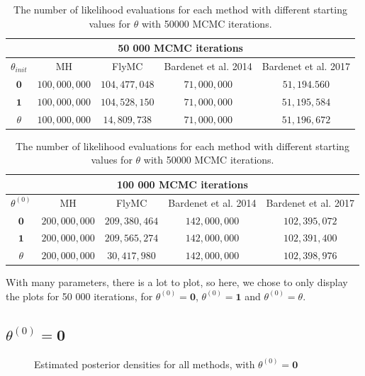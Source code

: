  \begin{table}
    \centering
\begin{tabular}{|c|c|c|c|c|}
  \hline
    \multicolumn{5}{|c|}{50 000 MCMC iterations} \\
    \hline
\hline
        $\theta_{init}$ &  MH & FlyMC & Bardenet et al. 2014 & Bardenet et al. 2017\\ 
         \hline \hline$\mathbf{0}$ & $100,000,000$ & $104,477,048$ & $71,000,000$ & $51,194.560$ \\
        $\mathbf{1}$ & $100,000,000$ & $104,528,150$ & $71,000,000$ & $51,195,584$ \\
        $\theta$ & $100,000,000$ & $14,809,738$ & $71,000,000$ & $51,196,672$
        \\ \hline
\end{tabular}
\caption{The number of likelihood evaluations for each method with different starting values for $\theta$ with 50000 MCMC iterations.}
\label{tab:multiple_evals_50k}
\end{table} 

 \begin{table}
    \centering
\begin{tabular}{|c|c|c|c|c|}
  \hline
    \multicolumn{5}{|c|}{100 000 MCMC iterations} \\
    \hline
\hline
        $\theta^{\left(0\right)}$ &  MH & FlyMC & Bardenet et al. 2014 & Bardenet et al. 2017\\ 
         \hline \hline$\mathbf{0}$ & $200,000,000$ & $209,380,464$ & $142,000,000$ & $102,395,072$ \\
        $\mathbf{1}$ & $200,000,000$ & $209,565,274$ & $142,000,000$ & $102,391,400$ \\
        $\theta$ & $200,000,000$ & $30,417,980$ & $142,000,000$ & $102,398,976$
        \\ \hline
\end{tabular}
\caption{The number of likelihood evaluations for each method with different starting values for $\theta$ with 50000 MCMC iterations.}
\label{tab:multiple_evals_100k}
\end{table} 
With many parameters, there is a lot to plot, so here, we chose to only display the plots for 50 000 iterations, for  $\theta^{\left(0\right)} = \mathbf{0}$, $\theta^{\left(0\right)} = \mathbf{1}$ and $\theta^{\left(0\right)} = \theta$.   

\subsection{$\theta^{\left(0\right)} = \mathbf{0}$}
\begin{figure}%
    \centering
    \qquad
    \caption{Estimated posterior densities for all methods, with $\theta^{\left(0\right)} = \mathbf{0}$}%
    \label{fig:density_50k_02_06_theta1}%
\end{figure}


